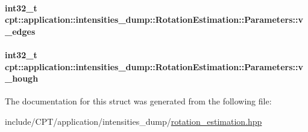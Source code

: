 \hypertarget{structcpt_1_1application_1_1intensities__dump_1_1_rotation_estimation_1_1_parameters_a944d7c077231cde600b7decbd5ec2764}{
\paragraph[{v\-\_\-edges}]{\setlength{\rightskip}{0pt plus 5cm}int32\-\_\-t cpt\-::application\-::intensities\-\_\-dump\-::\-Rotation\-Estimation\-::\-Parameters\-::v\-\_\-edges}}\label{structcpt_1_1application_1_1intensities__dump_1_1_rotation_estimation_1_1_parameters_a944d7c077231cde600b7decbd5ec2764}
\hypertarget{structcpt_1_1application_1_1intensities__dump_1_1_rotation_estimation_1_1_parameters_a0d5e4e9ea446669754a87bdcdce06afd}{
\paragraph[{v\-\_\-hough}]{\setlength{\rightskip}{0pt plus 5cm}int32\-\_\-t cpt\-::application\-::intensities\-\_\-dump\-::\-Rotation\-Estimation\-::\-Parameters\-::v\-\_\-hough}}\label{structcpt_1_1application_1_1intensities__dump_1_1_rotation_estimation_1_1_parameters_a0d5e4e9ea446669754a87bdcdce06afd}


The documentation for this struct was generated from the following file\-:\begin{DoxyCompactItemize}
\item 
include/\-C\-P\-T/application/intensities\-\_\-dump/\hyperlink{application_2intensities__dump_2rotation__estimation_8hpp}{rotation\-\_\-estimation.\-hpp}\end{DoxyCompactItemize}
